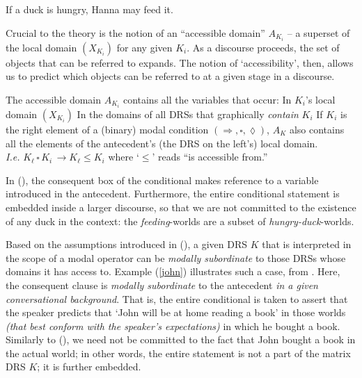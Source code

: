 \ex \label{donkey}  If a duck is hungry, Hanna may feed it. \\
\xe

Crucial to the theory is the notion of an ``accessible domain'' $ A_{K_i} $ -- a superset of the local domain $ (X_{K_i}) $ for any given $ K_i $. As a discourse proceeds, the set of objects that can be referred to expands. The notion of `accessibility', then, allows us to predict which objects can be referred to at a given stage in a discourse. 

\pex The accessible domain $ A_{K_i} $ contains all the variables that occur: 
\a In $ K_i $'s local domain $ (X_{K_i}) $
\a In the domains of all DRSs that graphically \textit{contain} $ K_i $
\a If $ K_i $ is the right element of a (binary) modal condition $(\Rightarrow,\square,\lozenge)$, $ A_K $ also contains all the elements of the antecedent's (the DRS on the left's) local domain.\\\textit{I.e.} $ K_\ell\,\square\,K_i\, \longrightarrow K_\ell\leqslant K_i$ where `$ \leqslant $' reads ``is accessible from.''\xe

In (\blastx), the consequent box of the conditional makes reference to a variable introduced in the antecedent. Furthermore, the entire conditional statement is embedded inside a larger discourse, so that we are not committed to the existence of any duck in the context: the \textit{feeding}-worlds are a subset of \textit{hungry-duck}-worlds.

Based on the assumptions introduced in (\lastx), a given DRS $ K $ that is interpreted in the scope of a modal operator can be \textit{modally subordinate} to those DRSs whose domains it has access to. Example (\ref{john}) illustrates such a case, from \citet[701]{Roberts1989}. Here, the consequent clause is \textit{modally subordinate} to the antecedent \textit{in a given conversational background}. That is, the entire conditional is taken to assert that the speaker predicts that `John will be at home reading a book' in those worlds \textit{(that best conform with the speaker's expectations)} in which he bought a book. Similarly to (), we need not be committed to the fact that John bought a book in the actual world; in other words, the entire statement is not a part of the matrix DRS $ K $; it is further embedded.


